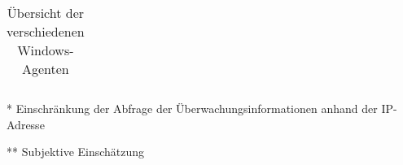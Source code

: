 \begin{table}[!cht]
\begin{threeparttable}
\begin{tabular}{l p{1.3cm} l p{1.3cm} l p{1.3cm} l p{1.3cm} l p{1.3cm} l p{1.3cm} l p{1.3cm} p{1.3cm} p{1.3cm} p{1.3cm} p{1.3cm}}
\end{tabular}
\begin{tablenotes}\footnotesize
        \item[*] Einschränkung der Abfrage der Überwachungsinformationen anhand der \gls{IP}-Adresse
        \item[**] Subjektive Einschätzung
    \end{tablenotes}
\caption{Übersicht der verschiedenen Windows-Agenten}
\end{threeparttable}
\end{table}
